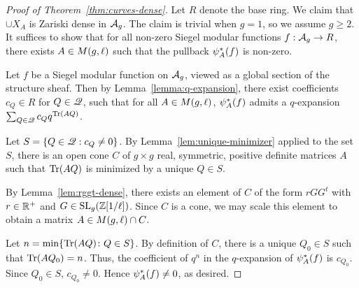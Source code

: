 \documentclass{amsart}
\begin{document}
\begin{proof}[Proof of Theorem~\ref{thm:curves-dense}]
  Let $R$ denote the base ring. We claim that $\cup X_A$ is Zariski dense in $\mathcal{A}_g$. The claim is trivial when $g = 1$, so we assume $g \geq 2$. It suffices to show that for all non-zero Siegel modular functions $f: \mathcal{A}_g \to R$, there exists $A \in M(g,\ell)$ such that the pullback $\psi_{A}^*(f)$ is non-zero.

  Let $f$ be a Siegel modular function on $\mathcal{A}_g$, viewed as a global section of the structure sheaf. Then by Lemma~\ref{lemma:q-expansion}, there exist coefficients $c_Q \in R$ for $Q \in \mathscr{Q}$, such that for all $A \in M(g,\ell)$, $\psi_{A}^*(f)$ admits a $q$-expansion $\sum_{Q \in \mathscr{Q}} c_Q q^{\operatorname{Tr}(AQ)}$.

  Let $S = \{ Q \in \mathscr{Q} :c_Q \neq 0\}$. By Lemma~\ref{lem:unique-minimizer} applied to the set $S$, there is an open cone $C$ of $g \times g$ real, symmetric, positive definite matrices $A$ such that $\operatorname{Tr}(AQ)$ is minimized by a unique $Q \in S$.

  By Lemma~\ref{lem:rggt-dense}, there exists an element of $C$ of the form $rGG^t$ with $r \in \mathbb{R}^+$ and $G \in \operatorname{SL}_g(\mathbb{Z}[1/\ell])$. Since $C$ is a cone, we may scale this element to obtain a matrix $A \in M(g,\ell) \cap C$.

  Let $n = \min \{\operatorname{Tr}(AQ) \colon Q \in S\}$. By definition of $C$, there is a unique $Q_0 \in S$ such that $\operatorname{Tr}(AQ_0) = n$. %
  Thus, the coefficient of $q^n$ in the $q$-expansion of $\psi_{A}^*(f)$ is $c_{Q_0}$. Since $Q_0 \in S$, $c_{Q_0} \ne 0$. Hence $\psi_{A}^*(f) \neq 0$, as desired.
\end{proof}









\end{document}
